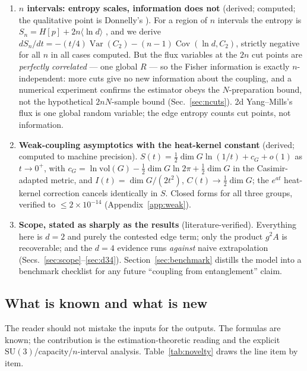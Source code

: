 \documentclass[11pt]{article}
\theoremstyle{remark}
\theoremstyle{plain}
\newcommand{\Var}{\operatorname{Var}}
\newcommand{\Cov}{\operatorname{Cov}}
\newcommand{\dG}{\dim G}
\begin{document}
\begin{enumerate}
\item \textbf{$n$ intervals: entropy scales, information does not} (derived; computed; the qualitative point is Donnelly's \cite{D14}). For a region of $n$ intervals the entropy is $S_n = H[p] + 2n\langle\ln d\rangle$ \cite[eq.~(YM2entropy), literature-verified]{D14}, and we derive $dS_n/dt = -(t/4)\Var(C_2) - (n-1)\Cov(\ln d, C_2)$, strictly negative for all $n$ in all cases computed. But the flux variables at the $2n$ cut points are \emph{perfectly correlated} --- one global $R$ --- so the Fisher information is exactly $n$-independent: more cuts give no new information about the coupling, and a numerical experiment confirms the estimator obeys the $N$-preparation bound, not the hypothetical $2nN$-sample bound (Sec.~\ref{sec:ncuts}). 2d Yang--Mills's flux is one global random variable; the edge entropy counts cut points, not information.

\item \textbf{Weak-coupling asymptotics with the heat-kernel constant} (derived; computed to machine precision). $S(t) = \tfrac12\dG\ln(1/t) + c_G + o(1)$ as $t \to 0^+$, with $c_G = \ln\mathrm{vol}(G) - \tfrac12\dG\ln 2\pi + \tfrac12\dG$ in the Casimir-adapted metric, and $I(t) = \dG/(2t^2)$, $C(t) \to \tfrac12\dG$; the $e^{at}$ heat-kernel correction cancels identically in $S$. Closed forms for all three groups, verified to $\leq 2\times10^{-14}$ (Appendix~\ref{app:weak}).

\item \textbf{Scope, stated as sharply as the results} (literature-verified). Everything here is $d = 2$ and purely the contested edge term; only the product $g^2 A$ is recoverable; and the $d = 4$ evidence runs \emph{against} naive extrapolation (Secs.~\ref{sec:scope}--\ref{sec:d34}). Section~\ref{sec:benchmark} distills the model into a benchmark checklist for any future ``coupling from entanglement'' claim.

\end{enumerate}

\subsection{What is known and what is new}\label{sec:novelty}

The reader should not mistake the inputs for the outputs. The formulas are known; the contribution is the estimation-theoretic reading and the explicit $\mathrm{SU}(3)$/capacity/$n$-interval analysis. Table~\ref{tab:novelty} draws the line item by item.
\end{document}
